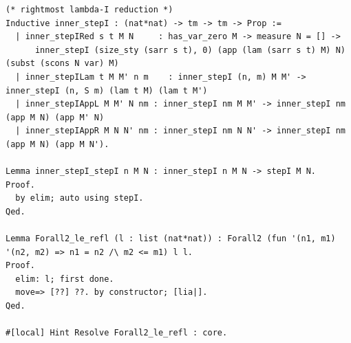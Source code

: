 \begin{lstlisting}[style=authorcoq]
(* rightmost lambda-I reduction *)
Inductive inner_stepI : (nat*nat) -> tm -> tm -> Prop :=
  | inner_stepIRed s t M N     : has_var_zero M -> measure N = [] ->
      inner_stepI (size_sty (sarr s t), 0) (app (lam (sarr s t) M) N) (subst (scons N var) M)
  | inner_stepILam t M M' n m    : inner_stepI (n, m) M M' -> inner_stepI (n, S m) (lam t M) (lam t M')
  | inner_stepIAppL M M' N nm : inner_stepI nm M M' -> inner_stepI nm (app M N) (app M' N)
  | inner_stepIAppR M N N' nm : inner_stepI nm N N' -> inner_stepI nm (app M N) (app M N').

Lemma inner_stepI_stepI n M N : inner_stepI n M N -> stepI M N.
Proof.
  by elim; auto using stepI.
Qed.

Lemma Forall2_le_refl (l : list (nat*nat)) : Forall2 (fun '(n1, m1) '(n2, m2) => n1 = n2 /\ m2 <= m1) l l.
Proof.
  elim: l; first done.
  move=> [??] ??. by constructor; [lia|].
Qed.

#[local] Hint Resolve Forall2_le_refl : core.


\end{lstlisting}
